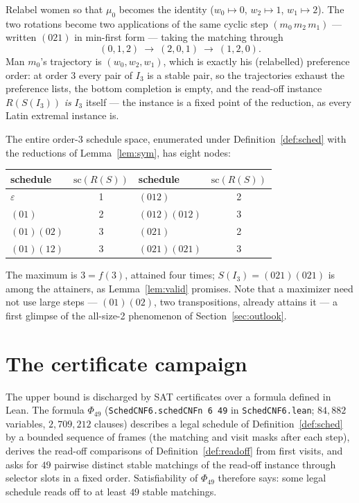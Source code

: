 \documentclass[11pt]{article}
\begin{document}
Relabel women so that $\mu_0$ becomes the identity ($w_0\mapsto 0$, $w_2\mapsto 1$,
$w_1\mapsto 2$). The two rotations become two applications of the same cyclic step
$(m_0\,m_2\,m_1)$ --- written $(021)$ in min-first form --- taking the matching through
\[
(0,1,2)\ \longrightarrow\ (2,0,1)\ \longrightarrow\ (1,2,0).
\]
Man $m_0$'s trajectory is $(w_0,w_2,w_1)$, which is exactly his (relabelled) preference
order: at order $3$ every pair of $I_3$ is a stable pair, so the trajectories exhaust the
preference lists, the bottom completion is empty, and the read-off instance
$R(S(I_3))$ \emph{is} $I_3$ itself --- the instance is a fixed point of the reduction,
as every Latin extremal instance is.

The entire order-3 schedule space, enumerated under Definition~\ref{def:sched} with the
reductions of Lemma~\ref{lem:sym}, has eight nodes:
\begin{center}
\begin{tabular}{lc@{\qquad\qquad}lc}
\toprule
schedule & $\mathrm{sc}(R(S))$ & schedule & $\mathrm{sc}(R(S))$\\
\midrule
$\varepsilon$    & 1 & $(012)$        & 2\\
$(01)$           & 2 & $(012)(012)$   & 3\\
$(01)(02)$       & 3 & $(021)$        & 2\\
$(01)(12)$       & 3 & $(021)(021)$   & 3\\
\bottomrule
\end{tabular}
\end{center}
The maximum is $3=f(3)$, attained four times; $S(I_3)=(021)(021)$ is among the
attainers, as Lemma~\ref{lem:valid} promises. Note that a maximizer need not use large
steps --- $(01)(02)$, two transpositions, already attains it --- a first glimpse of the
all-size-2 phenomenon of Section~\ref{sec:outlook}.

\section{The certificate campaign}\label{sec:campaign}

The upper bound is discharged by SAT certificates over a formula defined in Lean. The formula
$\Phi_{49}$ (\texttt{SchedCNF6.schedCNFn 6 49} in \texttt{SchedCNF6.lean}; $84{,}882$ variables,
$2{,}709{,}212$ clauses) describes a legal schedule of Definition~\ref{def:sched} by a bounded
sequence of frames (the matching and visit masks after each step), derives the read-off
comparisons of Definition~\ref{def:readoff} from first visits, and asks for $49$ pairwise distinct
stable matchings of the read-off instance through selector slots in a fixed order. Satisfiability
of $\Phi_{49}$ therefore says: some legal schedule reads off to at least $49$ stable matchings.
\end{document}
